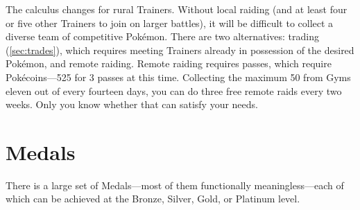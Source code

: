 The calculus changes for rural Trainers.
Without local raiding (and at least four or five other Trainers to join on larger battles),
  it will be difficult to collect a diverse team of competitive Pokémon.
There are two alternatives: trading (\autoref{sec:trades}), which requires meeting Trainers
  already in possession of the desired Pokémon, and remote raiding.
Remote raiding requires passes, which require Pokécoins---525 for 3 passes at this time.
Collecting the maximum 50 from Gyms eleven out of every fourteen days, you can do
  three free remote raids every two weeks.
Only you know whether that can satisfy your needs.

\section{Medals}
\label{sec:medals}
There is a large set of Medals---most of them functionally meaningless---each of which can be achieved at the Bronze,
 Silver, Gold, or Platinum level.
\begingroup
\setlength{\tabcolsep}{1pt}
